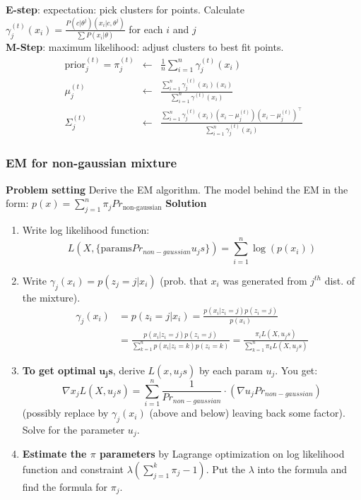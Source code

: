 \documentclass[main]{subfiles}
\begin{document}
\begin{landscape}
\begin{multicols}{4}
\textbf{E-step}: expectation: pick clusters for points.
Calculate $\gamma_j^{(t)}(x_i) = \frac{P(c|\theta^j) (x_i|c,\theta^j)}{\sum P(x_i|\theta)}$ for each $i$ and $j$\\
\textbf{M-Step}: maximum likelihood: adjust clusters to best fit points.\\
\begin{eqnarray}
\text{prior}_j^{(t)} = \pi^{(t)}_j &\leftarrow& \frac{1}{n}\sum_{i=1}^n \gamma_j^{(t)}(x_i) \\
\mu_j^{(t)} &\leftarrow& \frac{\sum_{i=1}^n \gamma_j^{(t)}(x_i)(x_i)}{\sum_{i=1}^n \gamma^{(t)}(x_i)} \\
\Sigma^{(t)}_j &\leftarrow& \frac{\sum_{i=1}^n \gamma_j^{(t)}(x_i)(x_i-\mu_j^{(t)})(x_i-\mu_j^{(t)})^\top}{\sum_{i=1}^n \gamma_j^{(t)}(x_i)}
\end{eqnarray}

\subsubsection{EM for non-gaussian mixture}
\textbf{Problem setting}
Derive the EM algorithm. The model behind the EM in the form:
\(p(x) = \sum\limits^n_{j=1}\pi_j Pr_{\text{non-gaussian}}\)
\textbf{Solution}
\begin{enumerate}[topsep=0pt,itemsep=-2ex,partopsep=1ex,parsep=1ex,leftmargin=*]
\item Write  log likelihood function:
\[L(X,\{\text{params}Pr_{non-gaussian} u_js\}) = \sum\limits^n_{i=1} \log \left( p(x_i)\right)\]
\item Write \(\gamma_j(x_i) = p(z_j = j | x_i)\) (prob. that \(x_i\) was generated from \(j^{th}\) dist. of the mixture).
\begin{align*}
\gamma_j(x_i) &= p(z_i = j | x_i) = \frac{p(x_i|z_i = j) p(z_i = j)}{p(x_i)}\\
&= \frac{p(x_i|z_i = j) p(z_i = j)}{\sum\limits^n_{k=1}p(x_i|z_i = k) p(z_i = k)}
= \frac{\pi_i L(X,u_js)}{\sum^n_{k=1}\pi_k L(X,u_js)}
\end{align*}
\item \textbf{To get optimal }\(\mathbf{u_js}\), derive \(L(x,u_js)\) by each param \(u_j\).
You get:
\[\nabla x_j L(X,u_js) = \sum\limits^n_{i=1}\frac{1}{Pr_{non-gaussian}} \cdot (\nabla u_j Pr_{non-gaussian})\](possibly replace by \(\gamma_j(x_i)\) (above and below) leaving back some factor). Solve for the parameter \(u_j\).
\item \textbf{Estimate the \(\pi\) parameters} by Lagrange optimization on log likelihood function and constraint \(\lambda \left(\sum\limits^k_{j=1}\pi_j -1\right) \). Put the \(\lambda\) into the formula and find the formula for \(\pi_j\).
\end{enumerate}


\end{multicols}
\end{landscape}
\end{document}
